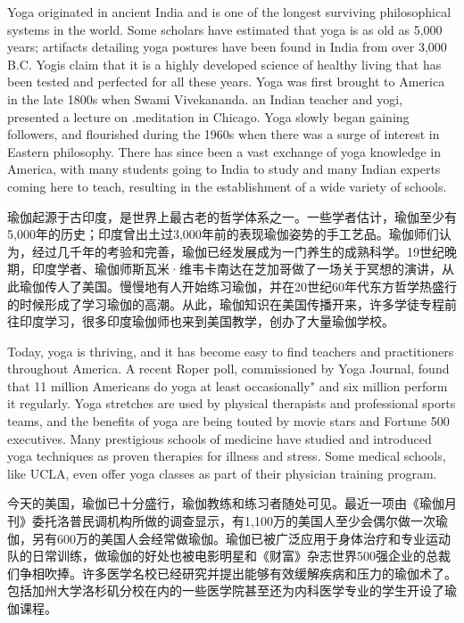 \documentclass[cs4size, a4paper,12pt]{article}
\newcounter{numpar}
\newcommand*{\newpar}{\numpar{}}
\begin{document}
\newpar Yoga originated in ancient India and is one of the longest surviving philosophical systems in the world. Some scholars have estimated that yoga is as old as 5,000 years; artifacts detailing yoga postures have been found in India from over 3,000 B.C. Yogis claim that it is a highly developed science of healthy living that has been tested and perfected for all these years. Yoga was first brought to America in the late 1800s when Swami Vivekananda. an Indian teacher and yogi, presented a lecture on .meditation in Chicago. Yoga slowly began gaining followers, and flourished during the 1960s when there was a surge of interest in Eastern philosophy. There has since been a vast exchange of yoga knowledge in America, with many students going to India to study and many Indian experts coming here to teach, resulting in the establishment of a wide variety of schools.

瑜伽起源于古印度，是世界上最古老的哲学体系之一。一些学者估计，瑜伽至少有5,000年的历史；印度曾出土过3,000年前的表现瑜伽姿势的手工艺品。瑜伽师们认为，经过几千年的考验和完善，瑜伽已经发展成为一门养生的成熟科学。19世纪晚期，印度学者、瑜伽师斯瓦米·维韦卡南达在芝加哥做了一场关于冥想的演讲，从此瑜伽传人了美国。慢慢地有人开始练习瑜伽，并在20世纪60年代东方哲学热盛行的时候形成了学习瑜伽的高潮。从此，瑜伽知识在美国传播开来，许多学徒专程前往印度学习，很多印度瑜伽师也来到美国教学，创办了大量瑜伽学校。

\newpar Today, yoga is thriving, and it has become easy to find teachers and practitioners throughout America. A recent Roper poll, commissioned by Yoga Journal, found that 11 million Americans do yoga at least occasionally" and six million perform it regularly.  Yoga stretches are used by physical therapists and professional sports teams, and the benefits of yoga are being touted by movie stars and Fortune 500 executives. Many prestigious schools of medicine have studied and introduced yoga techniques as proven therapies for illness and stress. Some medical schools, like UCLA, even offer yoga classes as part of their physician training program.

今天的美国，瑜伽已十分盛行，瑜伽教练和练习者随处可见。最近一项由《瑜伽月刊》委托洛普民调机构所做的调查显示，有1,100万的美国人至少会偶尔做一次瑜伽，另有600万的美国人会经常做瑜伽。瑜伽已被广泛应用于身体治疗和专业运动队的日常训练，做瑜伽的好处也被电影明星和《财富》杂志世界500强企业的总裁们争相吹捧。许多医学名校已经研究并提出能够有效缓解疾病和压力的瑜伽术了。包括加州大学洛杉矶分校在内的一些医学院甚至还为内科医学专业的学生开设了瑜伽课程。
\end{document}
